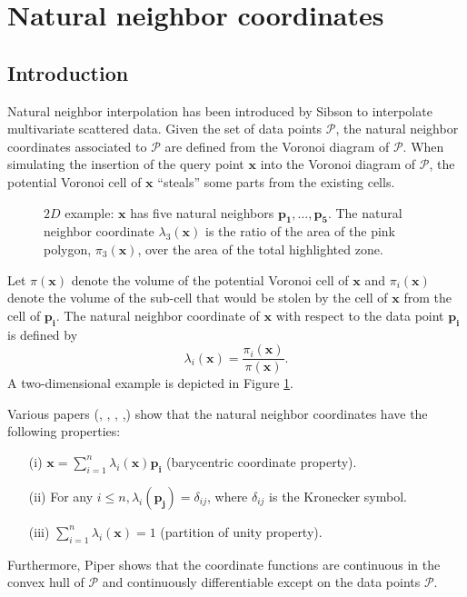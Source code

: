 \section{Natural neighbor coordinates}
\subsection{Introduction}
Natural neighbor interpolation has been introduced by Sibson
\cite{s-bdnni-81} to interpolate multivariate scattered data.  Given
the set of data points $\mathcal{P}$, the natural neighbor coordinates
associated to $\mathcal{P}$ are defined from the Voronoi diagram of
$\mathcal{P}$.  When simulating the insertion of the query point
$\mathbf{x}$ into the Voronoi diagram of $\mathcal{P}$, the potential
Voronoi cell of $\mathbf{x}$ ``steals'' some parts from the existing
cells. 
\begin{figure}[ht!]
\begin{center}
   
\end{center}
\caption{$2D$ example: $\mathbf{x}$ has five natural neighbors $\mathbf{p_1},\ldots , \mathbf{p_5}$. 
  The natural neighbor coordinate $\lambda_3(\mathbf{x})$ is the ratio
  of the area of the pink polygon, $\pi_3(\mathbf{x})$, over the area
  of the total highlighted zone.
  \label{fig:nn_coords}}
\end{figure}
Let $\pi(\mathbf{x})$ denote the volume of the potential Voronoi cell
of $\mathbf{x}$ and $\pi_i(\mathbf{x})$ denote the volume of the
sub-cell that would be stolen by the cell of $\mathbf{x}$ from the
cell of $\mathbf{p_i}$.  The natural neighbor coordinate of
$\mathbf{x}$ with respect to the data point $\mathbf{p_i}$ is defined
by
$$
\lambda_i(\mathbf{x}) =
\frac{\pi_i(\mathbf{x})}{\pi(\mathbf{x})}.$$
A two-dimensional example
is depicted in Figure \ref{fig:nn_coords}.


Various papers (\cite{s-vidt-80}, \cite{f-sodt-90},
\cite{bp-plcbdt-93}, \cite{b-scaps-97},\cite{hs-vbihc-00}) show that
the natural neighbor coordinates have the following properties:
  \begin{itemize}
  \item[(i)] $\mathbf{x} = \sum_{i=1}^n \lambda_i(\mathbf{x}) \mathbf{p_i}$
    (barycentric coordinate property).
  \item[(ii)] For any $i \leq n, \lambda_i(\mathbf{p_j})= \delta_{ij}$, where
    $\delta_{ij}$ is the Kronecker symbol.
  \item[(iii)] $\sum_{i=1}^n \lambda_i(\mathbf{x}) = 1$ (partition of unity
    property).
  \end{itemize}
  Furthermore, Piper \cite{bp-plcbdt-93} shows that the coordinate
  functions are continuous in the convex hull of $\mathcal{P}$ and
  continuously differentiable except on the data points $\mathcal{P}$.
  \medskip
  

